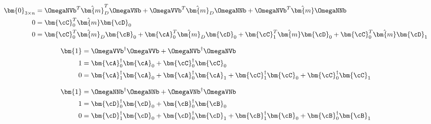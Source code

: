 \begin{align}
	\bm{0}_{3\times n} & =
	\OmegaNVb^{T}\hat{\bm{m}}^{T}_{D}\OmegaVNb+\OmegaVVb^{T}\hat{\bm{m}}_{D}\OmegaNNb+\OmegaNVb^{T}\hat{\bm{m}}\OmegaNNb \\
	0                  & = \bm{\cC}_{0}^{T}\hat{\bm{m}}\bm{\cD}_{0}                                                      \\
	0                  & =
	\bm{\cC}_{0}^{T}\hat{\bm{m}}_{D}\bm{\cB}_{0}
	+\bm{\cA}_{0}^{T}\hat{\bm{m}}_{D}\bm{\cD}_{0}
	+\bm{\cC}_{1}^{T}\hat{\bm{m}}\bm{\cD}_{0}
	+\bm{\cC}_{0}^{T}\hat{\bm{m}}\bm{\cD}_{1}
\end{align}


\begin{align}
	\bm{1} & = \OmegaVVb^{\dagger}\OmegaVVb + \OmegaNVb^{\dagger}\OmegaNVb             \\
	1      & = \bm{\cA}_{0}^{\dagger}\bm{\cA}_{0} + \bm{\cC}_{0}^{\dagger}\bm{\cC}_{0} \\
	0      & =
	\bm{\cA}_{1}^{\dagger}\bm{\cA}_{0} +
	\bm{\cA}_{0}^{\dagger}\bm{\cA}_{1} +
	\bm{\cC}_{1}^{\dagger}\bm{\cC}_{0} +
	\bm{\cC}_{0}^{\dagger}\bm{\cC}_{1}
\end{align}


\begin{align}
	\bm{1} & = \OmegaNNb^{\dagger}\OmegaNNb + \OmegaVNb^{\dagger}\OmegaVNb             \\
	1      & = \bm{\cD}_{0}^{\dagger}\bm{\cD}_{0} + \bm{\cB}_{0}^{\dagger}\bm{\cB}_{0} \\
	0      & =
	\bm{\cD}_{1}^{\dagger}\bm{\cD}_{0} +
	\bm{\cD}_{0}^{\dagger}\bm{\cD}_{1} +
	\bm{\cB}_{1}^{\dagger}\bm{\cB}_{0} +
	\bm{\cB}_{0}^{\dagger}\bm{\cB}_{1}
\end{align}


